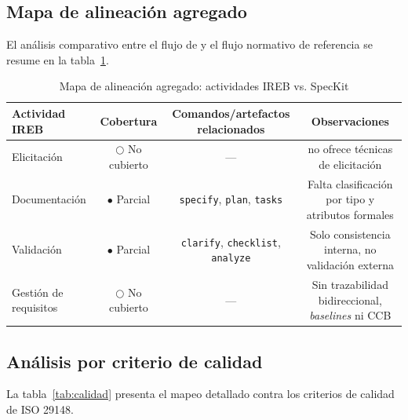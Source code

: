 \subsection{Mapa de alineaci\'on agregado}

El an\'alisis comparativo entre el flujo de \speckit{} y el flujo normativo de referencia se resume en la tabla~\ref{tab:mapa-agregado}.

\begin{table}[h]
\centering
\caption{Mapa de alineaci\'on agregado: actividades IREB vs. SpecKit}
\label{tab:mapa-agregado}
\begin{tabularx}{\textwidth}{lccc}
\toprule
\textbf{Actividad IREB} & \textbf{Cobertura} & \textbf{Comandos/artefactos relacionados} & \textbf{Observaciones} \\
\midrule
Elicitaci\'on & $\bigcirc$ No cubierto & --- & \speckit{} no ofrece t\'ecnicas de elicitaci\'on \\
Documentaci\'on & $\bullet$ Parcial & \texttt{specify}, \texttt{plan}, \texttt{tasks} & Falta clasificaci\'on por tipo y atributos formales \\
Validaci\'on & $\bullet$ Parcial & \texttt{clarify}, \texttt{checklist}, \texttt{analyze} & Solo consistencia interna, no validaci\'on externa \\
Gesti\'on de requisitos & $\bigcirc$ No cubierto & --- & Sin trazabilidad bidireccional, \emph{baselines} ni CCB \\
\bottomrule
\end{tabularx}
\end{table}

\newpage
\subsection{An\'alisis por criterio de calidad}

La tabla~\ref{tab:calidad} presenta el mapeo detallado contra los criterios de calidad de ISO 29148.

